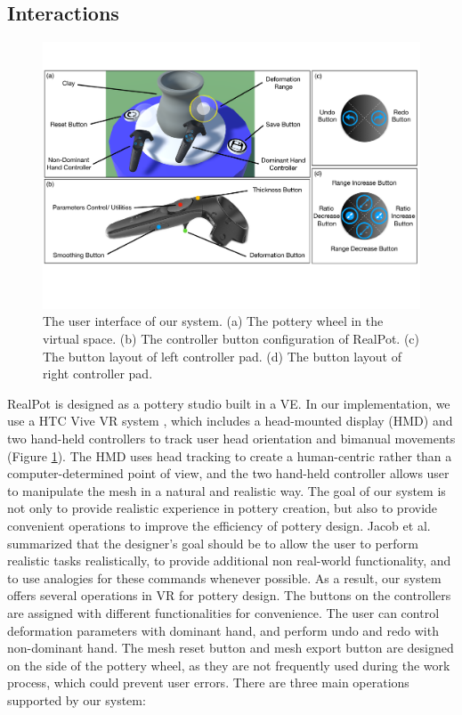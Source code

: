 \documentclass{svjour3}                     %
\begin{document}


\subsection{Interactions}
\label{sec:4.4}

\begin{figure}
\includegraphics[width=\textwidth]{fig9}
\caption{The user interface of our system. (a) The pottery wheel in the virtual space. (b) The controller button configuration of RealPot. (c) The button layout of left controller pad. (d) The button layout of right controller pad.}
\label{fig:ui}
\end{figure}

RealPot is designed as a pottery studio built in a VE.
In our implementation, we use a HTC Vive VR system \cite{website:vive}, which includes a head-mounted display (HMD) and two hand-held controllers to track user head orientation and bimanual movements (Figure \ref{fig:ui}).
The HMD uses head tracking to create a human-centric rather than a computer-determined point of view, and the two hand-held controller allows user to manipulate the mesh in a natural and realistic way.
The goal of our system is not only to provide realistic experience in pottery creation, but also to provide convenient operations to improve the efficiency of pottery design. 
Jacob et al. \cite{Jacob2008Reality} summarized that the designer's goal should be to allow the user to perform realistic tasks realistically, to provide additional non real-world functionality, and to use analogies for these commands whenever possible.
As a result, our system offers several operations in VR for pottery design.
The buttons on the controllers are assigned with different functionalities for convenience. The user can control deformation parameters with dominant hand, and perform undo and redo with non-dominant hand.
The mesh reset button and mesh export button are designed on the side of the pottery wheel, as they are not frequently used during the work process, which could prevent user errors.
There are three main operations supported by our system:
\end{document}
